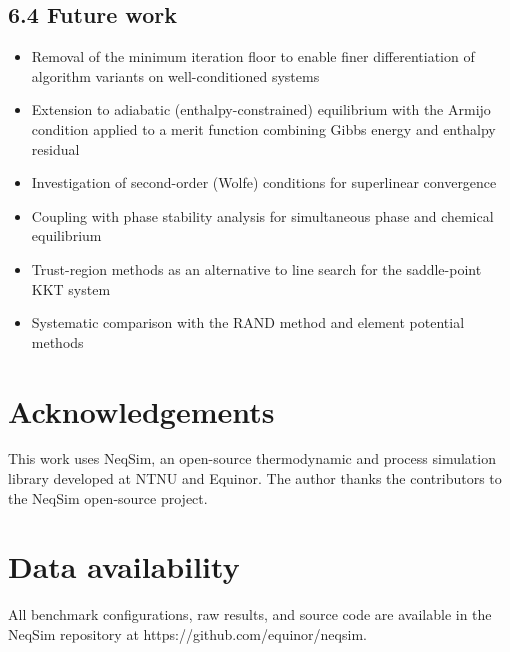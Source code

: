 \documentclass[review,3p]{elsarticle}
\begin{document}
\subsection{6.4 Future work}

\begin{itemize}
  \item Removal of the minimum iteration floor to enable finer differentiation of algorithm variants on well-conditioned systems
  \item Extension to adiabatic (enthalpy-constrained) equilibrium with the Armijo condition applied to a merit function combining Gibbs energy and enthalpy residual
  \item Investigation of second-order (Wolfe) conditions for superlinear convergence
  \item Coupling with phase stability analysis for simultaneous phase and chemical equilibrium
  \item Trust-region methods as an alternative to line search for the saddle-point KKT system
  \item Systematic comparison with the RAND method \citep{Tsanas2018} and element potential methods \citep{Reynolds1986}
\end{itemize}


\section{Acknowledgements}

This work uses NeqSim, an open-source thermodynamic and process simulation library developed at NTNU and Equinor. The author thanks the contributors to the NeqSim open-source project.

\section{Data availability}

All benchmark configurations, raw results, and source code are available in the NeqSim repository at https://github.com/equinor/neqsim.



\end{document}
